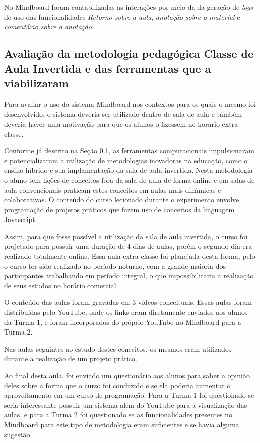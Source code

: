 No Mindboard foram contabilizadas as interações por meio da da geração de \emph{logs} de uso das funcionalidades \emph{Retorno sobre a aula}, \emph{anotação sobre o material} e \emph{comentário sobre a anotação}.

\subsection{Avaliação da metodologia pedagógica Classe de Aula Invertida e das ferramentas que a viabilizaram}
\label{sec:flipped}

Para avaliar o uso do sistema Mindboard nos contextos para os quais o mesmo foi desenvolvido, o sistema deveria ser utilizado dentro de sala de aula e também deveria haver uma motivação para que os alunos o fizessem no horário extra-classe.

Conforme já descrito na Seção \ref{sec:flipped}, as ferramentas computacionais impulsionaram e potencializaram a utilização de metodologias inovadoras na educação, como o ensino híbrido e sua implamentação da sala de aula invertida. Nesta metodologia o aluno tem lições de conceitos fora da sala de aula de forma online e em salas de aula convencionais praticam estes conceitos em aulas mais dinâmicas e colaborativas. O conteúdo do curso lecionado durante o 
experimento envolve programação de projetos práticos que fazem uso de conceitos da linguagem Javascript.

Assim, para que fosse possível a utilização da sala de aula invertida, o curso foi projetado para possuir uma duração de 4 dias de aulas, porém o segundo dia era realizado totalmente online. Essa aula extra-classe foi planejada desta forma, pelo o curso ter sido realizado no período noturno, com a grande maioria dos participantes trabalhando em período integral, o que impossibilitaria a realização de seus estudos no horário comercial.

O conteúdo das aulas foram gravadas em 3 vídeos conceituais. Essas aulas foram distribuídas pelo YouTube, onde os links eram diretamente enviados aos alunos da Turma 1, e foram incorporados do próprio YouTube no Mindboard para a Turma 2.

Nas aulas seguintes ao estudo destes conceitos, os mesmos eram utilizados durante a realização de um projeto prático.

Ao final desta aula, foi enviado um questionário aos alunos para saber a opinião deles sobre a forma que o curso foi conduzido e se ela poderia aumentar o aproveitamento em um curso de programação. Para a Turma 1 foi questionado se seria interessante possuir um sistema além do YouTube para a visualização das aulas, e para a Turma 2 foi questionado se as funcionalidades presentes no Mindboard para este tipo de metodologia eram suficientes e se havia alguma sugestão.

